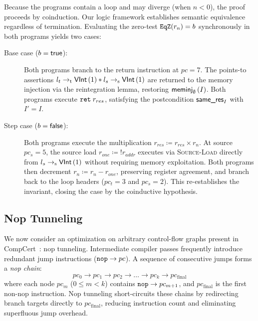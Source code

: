 \documentclass[report.tex]{subfiles}
\begin{document}
Because the programs contain a loop and may diverge (when $n < 0$),
the proof proceeds by coinduction.
Our logic framework establishes semantic equivalence regardless of
termination.
Evaluating the zero-test $\mathtt{EqZ}(r_n) = b$
synchronously in both programs yields two cases:
\begin{description}
  \item[Base case ({\normalfont $b = \textsf{true}$}):]
        Both programs branch to the return instruction at $pc = 7$.
        The points-to assertions
        $l_t \to_{\text{t}} \textsf{VInt}\left(1\right) \mathbin{\ast} l_s \to_{\text{s}} \textsf{VInt}\left(1\right)$
        are returned to the memory injection via the reintegration lemma,
        restoring $\textsf{meminj}_{\emptyset}\left(I\right)$.
        Both programs execute $\mathtt{ret}\; r_{res}$,
        satisfying the postcondition $\textsf{same\_res}_{I}$ with $I' = I$.

  \item[Step case ({\normalfont $b = \textsf{false}$}):]
        Both programs execute the multiplication
        $r_{res} \coloneqq r_{res} \times r_n$.
        At source $pc_s = 5$,
        the source load $r_{one} \coloneqq {!r_{addr}}$ executes via
        \textsc{Source-Load}
        directly from $l_s \to_{\text{s}} \textsf{VInt}\left(1\right)$
        without requiring memory exploitation.
        Both programs then decrement $r_n \coloneqq r_n - r_{one}$,
        preserving register agreement,
        and branch back to the loop headers ($pc_t = 3$ and $pc_s = 2$).
        This re-establishes the invariant,
        closing the case by the coinductive hypothesis.
\end{description}

\subsection{Nop Tunneling}
\label{sec:case-study-nop}

We now consider an optimization on arbitrary control-flow graphs present in
CompCert~\parencite{leroy-09-backend}:
nop tunneling.
Intermediate compiler passes frequently introduce redundant jump
instructions ($\mathtt{nop} \to pc$).
A sequence of consecutive jumps forms a \emph{nop chain}:
\begin{equation*}
  pc_0 \to pc_1 \to pc_2 \to \dots \to pc_k \to pc_{\text{final}}
\end{equation*}
where each node $pc_m$ ($0 \leqslant m < k$) contains $\mathtt{nop} \to pc_{m+1}$,
and $pc_{\text{final}}$ is the first non-nop instruction.
Nop tunneling short-circuits these chains by redirecting branch targets
directly to $pc_{\text{final}}$,
reducing instruction count and eliminating superfluous jump overhead.
\end{document}
